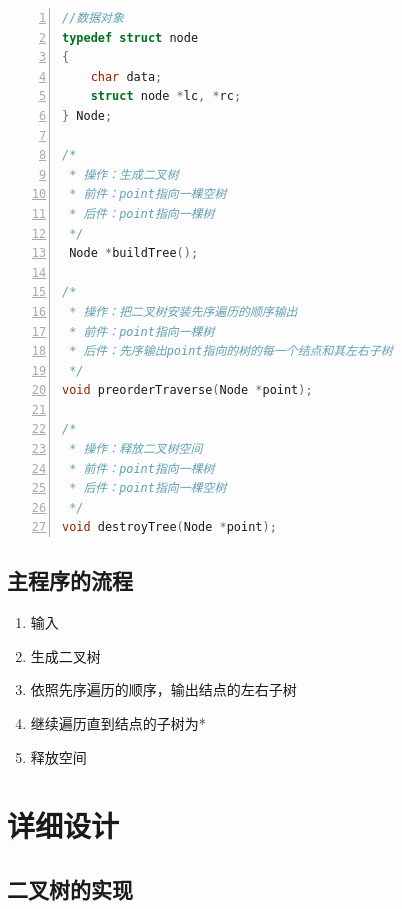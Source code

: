 \documentclass{article}
\begin{document}
\begin{lstlisting}[language={C},
    numbers=left,
    numberstyle=\tiny\consolas,
    basicstyle=\small\consolas]
//数据对象
typedef struct node
{
    char data;
    struct node *lc, *rc;
} Node;

/*
 * 操作：生成二叉树
 * 前件：point指向一棵空树
 * 后件：point指向一棵树
 */
 Node *buildTree();

/*
 * 操作：把二叉树安装先序遍历的顺序输出
 * 前件：point指向一棵树
 * 后件：先序输出point指向的树的每一个结点和其左右子树
 */
void preorderTraverse(Node *point);

/*
 * 操作：释放二叉树空间
 * 前件：point指向一棵树
 * 后件：point指向一棵空树
 */
void destroyTree(Node *point);

\end{lstlisting}

\subsection{主程序的流程}

\begin{enumerate}
    \item 输入
    \item 生成二叉树
    \item 依照先序遍历的顺序，输出结点的左右子树
    \item 继续遍历直到结点的子树为*
    \item 释放空间
\end{enumerate}







\section{详细设计}

\subsection{二叉树的实现}
\end{document}
